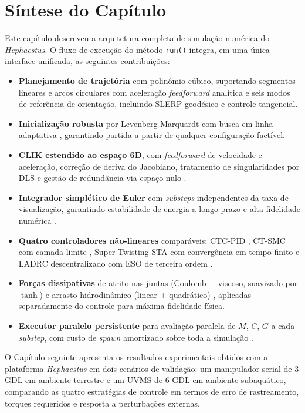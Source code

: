 \section{Síntese do Capítulo}

Este capítulo descreveu a arquitetura completa de simulação numérica do \textit{Hephaestus}. O fluxo de execução do método \texttt{run()} integra, em uma única interface unificada, as seguintes contribuições:

\begin{itemize}
    \item \textbf{Planejamento de trajetória} com polinômio cúbico, suportando segmentos lineares e arcos circulares com aceleração \textit{feedforward} analítica e seis modos de referência de orientação, incluindo SLERP geodésico \cite{shoemake1985animating} e controle tangencial.
    \item \textbf{Inicialização robusta} por Levenberg-Marquardt com busca em linha adaptativa \cite{marquardt1963algorithm, armijo1966minimization}, garantindo partida a partir de qualquer configuração factível.
    \item \textbf{CLIK estendido ao espaço 6D}, com \textit{feedforward} de velocidade e aceleração, correção de deriva do Jacobiano, tratamento de singularidades por DLS \cite{nakamura1986inverse} e gestão de redundância via espaço nulo \cite{chiaverini1997singularity, liegeois1977automatic}.
    \item \textbf{Integrador simplético de Euler} com \textit{substeps} independentes da taxa de visualização, garantindo estabilidade de energia a longo prazo e alta fidelidade numérica \cite{leimkuhler2004simulating, hairer2006geometric}.
    \item \textbf{Quatro controladores não-lineares} comparáveis: CTC-PID \cite{craig1989introduction, astrom1995theory}, CT-SMC com camada limite \cite{slotine1991applied, burton1986continuous}, Super-Twisting STA com convergência em tempo finito \cite{levant1993sliding, moreno2012strict} e LADRC descentralizado com ESO de terceira ordem \cite{gao2003scaling, zheng2010practical, huang2014active}.
    \item \textbf{Forças dissipativas} de atrito nas juntas (Coulomb + viscoso, suavizado por $\tanh$) e arrasto hidrodinâmico (linear + quadrático) \cite{fossen2011handbook, antonelli2014modelling}, aplicadas separadamente do controle para máxima fidelidade física.
    \item \textbf{Executor paralelo persistente} para avaliação paralela de $M$, $C$, $G$ a cada \textit{substep}, com custo de \textit{spawn} amortizado sobre toda a simulação \cite{beazley2010understanding, leu1986automated}.
\end{itemize}

O Capítulo seguinte apresenta os resultados experimentais obtidos com a plataforma \textit{Hephaestus} em dois cenários de validação: um manipulador serial de 3 GDL em ambiente terrestre e um UVMS de 6 GDL em ambiente subaquático, comparando as quatro estratégias de controle em termos de erro de rastreamento, torques requeridos e resposta a perturbações externas.

